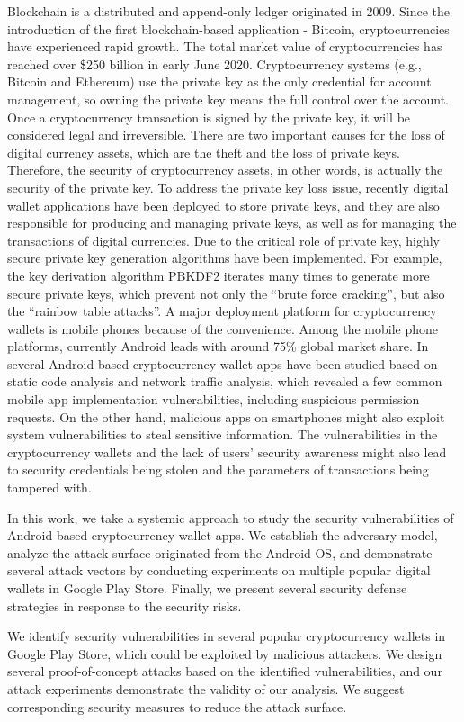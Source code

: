 \documentclass[12pt]{article}
\begin{document}
Blockchain is a distributed and append-only ledger originated in 2009. Since the introduction of the first
blockchain-based application - Bitcoin, cryptocurrencies have
experienced rapid growth. The total market value of cryptocurrencies has reached over \$250 billion in early June 2020.
Cryptocurrency systems (e.g., Bitcoin and Ethereum) use
the private key as the only credential for account management, so owning the private key means the full control over
the account. Once a cryptocurrency transaction is signed by
the private key, it will be considered legal and irreversible.
There are two important causes for the loss of digital currency
assets, which are the theft and the loss of private keys.
Therefore, the security of cryptocurrency assets, in other
words, is actually the security of the private key.
To address the private key loss issue, recently digital wallet
applications have been deployed to store private keys, and
they are also responsible for producing and managing private
keys, as well as for managing the transactions of digital
currencies. Due to the critical role of private key, highly
secure private key generation algorithms have been implemented. For example, the key derivation algorithm PBKDF2
iterates many times to generate more secure private keys,
which prevent not only the “brute force cracking”, but also
the “rainbow table attacks”.
A major deployment platform for cryptocurrency wallets
is mobile phones because of the convenience. Among the
mobile phone platforms, currently Android leads with around
75\% global market share. In several Android-based
cryptocurrency wallet apps have been studied based on static
code analysis and network traffic analysis, which revealed
a few common mobile app implementation vulnerabilities,
including suspicious permission requests. On the other hand,
malicious apps on smartphones might also exploit system
vulnerabilities to steal sensitive information. The vulnerabilities in the cryptocurrency wallets and the lack of users’
security awareness might also lead to security credentials being stolen and the parameters of transactions being tampered
with.
\par
In this work, we take a systemic approach to study the security vulnerabilities of Android-based cryptocurrency wallet
apps. We establish the adversary model, analyze the attack
surface originated from the Android OS, and demonstrate
several attack vectors by conducting experiments on multiple
popular digital wallets in Google Play Store. Finally, we
present several security defense strategies in response to the
security risks.
\par
 We identify security vulnerabilities in several popular
cryptocurrency wallets in Google Play Store, which
could be exploited by malicious attackers.
 We design several proof-of-concept attacks based on
the identified vulnerabilities, and our attack experiments
demonstrate the validity of our analysis.
 We suggest corresponding security measures to reduce
the attack surface.
\end{document}
